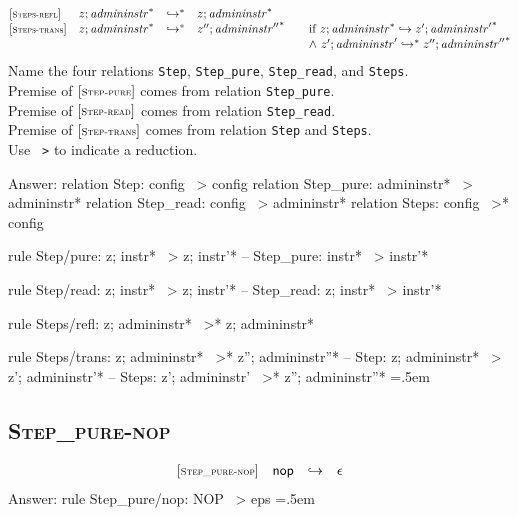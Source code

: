 \documentclass{article}
\newenvironment{lcverbatim}
 {\SaveVerbatim{cverb}}
 {\endSaveVerbatim
  \flushleft\fboxrule=0pt\fboxsep=.5em
  \colorbox{cverbbg}{%
    \makebox[\dimexpr\linewidth-2\fboxsep][l]{\BUseVerbatim{cverb}}%
  }
  \endflushleft
}
\newcommand\K[1]{\texttt{#1}}
\begin{document}
$$
\begin{array}{@{}l@{}rcl@{}l@{}}
	{[\textsc{\scriptsize Steps{-}refl}]} \quad & z ; {{\mathit{admininstr}}^\ast} &\hookrightarrow^\ast& z ; {{\mathit{admininstr}}^\ast} \\
	{[\textsc{\scriptsize Steps{-}trans}]} \quad & z ; {{\mathit{admininstr}}^\ast} &\hookrightarrow^\ast& {z''} ; {{\mathit{admininstr}''}^\ast}
	&\qquad \mbox{if}~z ; {{\mathit{admininstr}}^\ast} \hookrightarrow {z'} ; {{\mathit{admininstr}'}^\ast} \\
	&&&&\qquad {\land}~{z'} ; {\mathit{admininstr}'} \hookrightarrow^\ast {z''} ; {{\mathit{admininstr}''}^\ast} \\
\end{array}
$$
Name the four relations \K{Step}, \K{Step\_pure}, \K{Step\_read}, and \K{Steps}. \\
Premise of $[\textsc{\scriptsize Step{-}pure}]$ comes from relation \K{Step\_pure}. \\
Premise of $[\textsc{\scriptsize Step{-}read}]$ comes from relation \K{Step\_read}. \\
Premise of $[\textsc{\scriptsize Step{-}trans}]$ comes from relation \K{Step} and \K{Steps}. \\
Use \K{~>} to indicate a reduction. \\
{\color{red}
	Answer:
	\begin{lcverbatim}
relation Step: config ~> config
relation Step_pure: admininstr* ~> admininstr*
relation Step_read: config ~> admininstr*
relation Steps: config ~>* config

rule Step/pure:
  z; instr*  ~>  z; instr'*
  -- Step_pure: instr* ~> instr'*

rule Step/read:
  z; instr*  ~>  z; instr'*
  -- Step_read: z; instr* ~> instr'*

rule Steps/refl:
  z; admininstr* ~>* z; admininstr*

rule Steps/trans:
  z; admininstr*  ~>*  z''; admininstr''*
  -- Step: z; admininstr*  ~>  z'; admininstr'*
  -- Steps: z'; admininstr'  ~>*  z''; admininstr''*
	\end{lcverbatim}
}

\subsection{\normalfont\normalsize\textsc {Step\_pure-nop}}
$$
\begin{array}{@{}l@{}rcl@{}l@{}}
	{[\textsc{\scriptsize Step\_pure{-}nop}]} \quad & \mathsf{nop} &\hookrightarrow& \epsilon \\
\end{array}
$$
{\color{red}
	Answer:
	\begin{lcverbatim}
rule Step_pure/nop:
  NOP  ~>  eps
	\end{lcverbatim}
}
\end{document}
